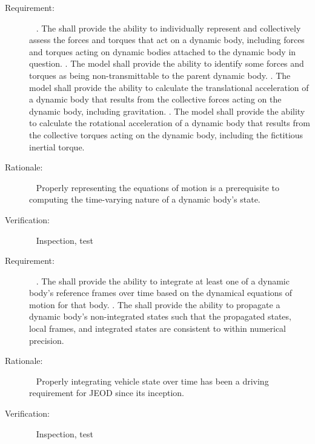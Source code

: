 \label{reqt:eom}
\begin{description}
\item[Requirement:]\ \newline
  \label{reqt:force_torque}.
    The \ModelDesc shall provide the ability to individually represent
    and collectively assess the forces and torques that act on a dynamic body,
    including forces and torques acting on dynamic bodies attached to
    the dynamic body in question.
  \label{reqt:no_xmit}.
    The model shall provide the ability to identify some forces and torques
    as being non-transmittable to the parent dynamic body.
  \label{trans_accel}.
    The model shall provide the ability to calculate the translational
    acceleration of a dynamic body that results from the collective forces
    acting on the dynamic body, including gravitation.
  \label{rot_accel}.
    The model shall provide the ability to calculate the rotational
    acceleration of a dynamic body that results from the collective torques
    acting on the dynamic body, including the fictitious inertial torque.

\item[Rationale:]\ \newline
  Properly representing the equations of motion is a prerequisite
  to computing the time-varying nature of a dynamic body's state.

\item[Verification:]\ \newline
  Inspection, test
\end{description}


\label{reqt:state_integ_prop}
\begin{description}
\item[Requirement:]\ \newline
  \label{reqt:state_integ}.
    The \ModelDesc shall provide the ability to integrate at least one of a
    dynamic body's reference frames over time based on the dynamical equations
    of motion for that body.
  \label{reqt:state_prop}.
    The \ModelDesc shall provide the ability to propagate a dynamic body's
    non-integrated states such that the propagated states, local frames,
    and integrated states are consistent to within numerical precision.

\item[Rationale:]\ \newline
  Properly integrating vehicle state over time has been a driving requirement
  for JEOD since its inception.

\item[Verification:]\ \newline
  Inspection, test
\end{description}


